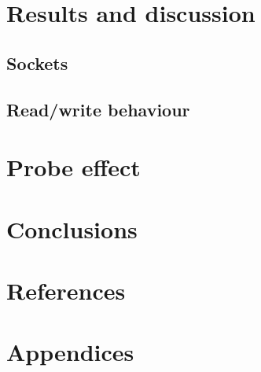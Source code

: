 \documentclass[a4paper,10pt]{article}
\begin{document}
\section{Results and discussion}





\subsection{Sockets}


\subsection{Read/write behaviour}


\section{Probe effect}

\section{Conclusions}

\newpage

\section{References}

\printbibliography

\section{Appendices}
\end{document}
